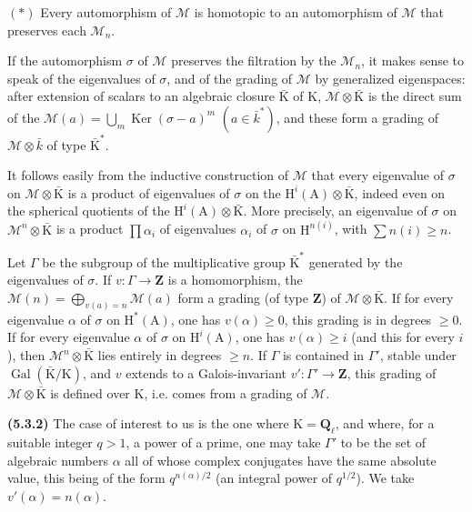 \documentclass[11pt,leqno]{article}
\begin{document}
\((*)\) Every automorphism of \(\mathcal{M}\) is homotopic to an automorphism of \(\mathcal{M}\) that preserves each \(\mathcal{M}_n\).

If the automorphism \(\sigma\) of \(\mathcal{M}\) preserves the filtration by the \(\mathcal{M}_n\), it makes sense to speak of the eigenvalues of \(\sigma\), and of the grading of \(\mathcal{M}\) by generalized eigenspaces: after extension of scalars to an algebraic closure \(\bar{\mathrm{K}}\) of \(\mathrm{K}\), \(\mathcal{M}\otimes\bar{\mathrm{K}}\) is the direct sum of the \(\mathcal{M}(a)=\bigcup\limits_m\operatorname{Ker}(\sigma-a)^m\) \((a\in\bar{k}^*)\), and these form a grading of \(\mathcal{M}\otimes\bar{k}\) of type \(\bar{\mathrm{K}}^*\).

It follows easily from the inductive construction of \(\mathcal{M}\) that every eigenvalue of \(\sigma\) on \(\mathcal{M}\otimes\bar{\mathrm{K}}\) is a product of eigenvalues of \(\sigma\) on the \(\mathrm{H}^i(\mathrm{A})\otimes\bar{\mathrm{K}}\), indeed even on the spherical quotients of the \(\mathrm{H}^i(\mathrm{A})\otimes\bar{\mathrm{K}}\). More precisely, an eigenvalue of \(\sigma\) on \(\mathcal{M}^n\otimes\bar{\mathrm{K}}\) is a product \(\prod\alpha_i\) of eigenvalues \(\alpha_i\) of \(\sigma\) on \(\mathrm{H}^{n(i)}\), with \(\sum n(i)\geq n\).

Let \(\Gamma\) be the subgroup of the multiplicative group \(\bar{\mathrm{K}}^*\) generated by the eigenvalues of \(\sigma\). If \(v:\Gamma\to\mathbf{Z}\) is a homomorphism, the \(\mathcal{M}(n)=\bigoplus\limits_{v(a)=n}\mathcal{M}(a)\) form a grading (of type \(\mathbf{Z}\)) of \(\mathcal{M}\otimes\bar{\mathrm{K}}\). If for every eigenvalue \(\alpha\) of \(\sigma\) on \(\mathrm{H}^*(\mathrm{A})\), one has \(v(\alpha)\geq0\), this grading is in degrees \(\geq0\). If for every eigenvalue \(\alpha\) of \(\sigma\) on \(\mathrm{H}^i(\mathrm{A})\), one has \(v(\alpha)\geq i\) (and this for every \(i\)), then \(\mathcal{M}^n\otimes\bar{\mathrm{K}}\) lies entirely in degrees \(\geq n\). If \(\Gamma\) is contained in \(\Gamma'\), stable under \(\operatorname{Gal}(\bar{\mathrm{K}}/\mathrm{K})\), and \(v\) extends to a Galois-invariant \(v':\Gamma'\to\mathbf{Z}\), this grading of \(\mathcal{M}\otimes\bar{\mathrm{K}}\) is defined over \(\mathrm{K}\), i.e. comes from a grading of \(\mathcal{M}\).

\textbf{(5.3.2)} The case of interest to us is the one where \(\mathrm{K}=\mathbf{Q}_{\ell}\), and where, for a suitable integer \(q>1\), a power of a prime, one may take \(\Gamma'\) to be the set of algebraic numbers \(\alpha\) all of whose complex conjugates have the same absolute value, this being of the form \(q^{n(\alpha)/2}\) (an integral power of \(q^{1/2}\)). We take \(v'(\alpha)=n(\alpha)\).
\end{document}
